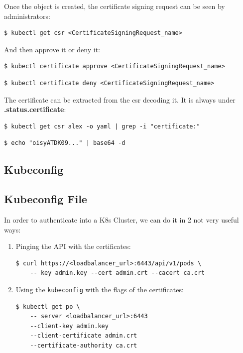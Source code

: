\documentclass{article}
\newenvironment{codetemplate}[1][]{%
  \mybasecolorbox[#1]
  \itshape
}{%
  \endmybasecolorbox
}
\begin{document}
Once the object is created, the certificate signing request can be seen by administrators:
\begin{codetemplate}{}
\begin{verbatim}
$ kubectl get csr <CertificateSigningRequest_name>
\end{verbatim}
\end{codetemplate}

And then approve it or deny it:
\begin{codetemplate}{}
\begin{verbatim}
$ kubectl certificate approve <CertificateSigningRequest_name>
\end{verbatim}
\end{codetemplate}
\begin{codetemplate}{}
\begin{verbatim}
$ kubectl certificate deny <CertificateSigningRequest_name>
\end{verbatim}
\end{codetemplate}

The certificate can be extracted from the csr decoding it. It is always under \textbf{.status.certificate}:
\begin{codetemplate}{}
\begin{verbatim}
$ kubectl get csr alex -o yaml | grep -i "certificate:"
\end{verbatim}
\end{codetemplate}
\begin{codetemplate}{}
\begin{verbatim}
$ echo "oisyATDK09..." | base64 -d
\end{verbatim}
\end{codetemplate}

\subsection{Kubeconfig}
\subsection{Kubeconfig File}
In order to authenticate into a K8s Cluster, we can do it in 2 not very useful ways:

\begin{enumerate}
    \item Pinging the API with the certificates:
\begin{codetemplate}{}
\begin{verbatim}
$ curl https://<loadbalancer_url>:6443/api/v1/pods \
    -- key admin.key --cert admin.crt --cacert ca.crt
\end{verbatim}
\end{codetemplate}
    \item Using the \verb|kubeconfig| with the flags of the certificates:
\begin{codetemplate}{}
\begin{verbatim}
$ kubectl get po \
    -- server <loadbalancer_url>:6443
    --client-key admin.key
    --client-certificate admin.crt
    --certificate-authority ca.crt
\end{verbatim}
\end{codetemplate}
\end{enumerate}
\end{document}
